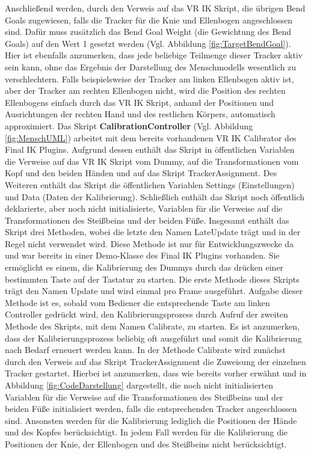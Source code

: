 Anschließend werden, durch den Verweis auf das VR IK Skript, die übrigen Bend Goals zugewiesen, falls die Tracker für die Knie und Ellenbogen angeschlossen sind. Dafür muss zusätzlich das Bend Goal Weight (die Gewichtung des Bend Goals) auf den Wert 1 gesetzt werden (Vgl. Abbildung \ref{fig:TargetBendGoal}). Hier ist ebenfalls anzumerken, dass jede beliebige Teilmenge dieser Tracker aktiv sein kann, ohne das Ergebnis der Darstellung des Menschmodells wesentlich zu verschlechtern. Falls beispielsweise der Tracker am linken Ellenbogen aktiv ist, aber der Tracker am rechten Ellenbogen nicht, wird die Position des rechten Ellenbogens einfach durch das VR IK Skript, anhand der Positionen und Ausrichtungen der rechten Hand und des restlichen Körpers, automatisch approximiert.
\newline\newline
Das Skript \textbf{CalibrationController} (Vgl. Abbildung \ref{fig:MenschUML}) arbeitet mit dem bereits vorhandenen VR IK Calibrator des Final IK Plugins. Aufgrund dessen enthält das Skript in öffentlichen Variablen die Verweise auf das VR IK Skript vom Dummy, auf die Transformationen vom Kopf und den beiden Händen und auf das Skript TrackerAssignment. Des Weiteren enthält das Skript die öffentlichen Variablen Settings (Einstellungen) und Data (Daten der Kalibrierung). Schließlich enthält das Skript noch öffentlich deklarierte, aber noch nicht initialisierte, Variablen für die Verweise auf die Transformationen des Steißbeins und der beiden Füße.
\newline
Insgesamt enthält das Skript drei Methoden, wobei die letzte den Namen LateUpdate trägt und in der Regel nicht verwendet wird. Diese Methode ist nur für Entwicklungszwecke da und war bereits in einer Demo-Klasse des Final IK Plugins vorhanden. Sie ermöglicht es einem, die Kalibrierung des Dummys durch das drücken einer bestimmten Taste auf der Tastatur zu starten. Die erste Methode dieses Skripts trägt den Namen Update und wird einmal pro Frame ausgeführt. Aufgabe dieser Methode ist es, sobald vom Bediener die entsprechende Taste am linken Controller gedrückt wird, den Kalibrierungsprozess durch Aufruf der zweiten Methode des Skripts, mit dem Namen Calibrate, zu starten. Es ist anzumerken, dass der Kalibrierungsprozess beliebig oft ausgeführt und somit die Kalibrierung nach Bedarf erneuert werden kann.
In der Methode Calibrate wird zunächst durch den Verweis auf das Skript TrackerAssignment die Zuweisung der einzelnen Tracker gestartet. Hierbei ist anzumerken, dass wie bereits vorher erwähnt und in Abbildung \ref{fig:CodeDarstellung} dargestellt, die noch nicht initialisierten Variablen für die Verweise auf die Transformationen des Steißbeins und der beiden Füße initialisiert werden, falls die entsprechenden Tracker angeschlossen sind. Ansonsten werden für die Kalibrierung lediglich die Positionen der Hände und des Kopfes berücksichtigt. In jedem Fall werden für die Kalibrierung die Positionen der Knie, der Ellenbogen und des Steißbeins nicht berücksichtigt.
